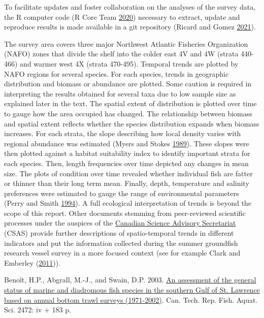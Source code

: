 \documentclass[12pt]{article}\usepackage[]{graphicx}\usepackage[]{color}
\begin{document}
To facilitate updates and foster collaboration on the analyses of the survey data, the R computer code (R Core Team \protect\hyperlink{ref-R:2020}{2020}) necessary to extract, update and reproduce results is made available in a git repository (Ricard and Gomez \protect\hyperlink{ref-Ricard-Gomez-2021}{2021}).

The survey area covers three major Northwest Atlantic Fisheries Organization (NAFO) zones that divide the shelf into the colder east 4V and 4W (strata 440-466) and warmer west 4X (strata 470-495). Temporal trends are plotted by NAFO regions for several species. For each species, trends in geographic distribution and biomass or abundance are plotted. Some caution is required in interpreting the results obtained for several taxa due to low sample size as explained later in the text. The spatial extent of distribution is plotted over time to gauge how the area occupied has changed. The relationship between biomass and spatial extent reflects whether the species distribution expands when biomass increases. For each strata, the slope describing how local density varies with regional abundance was estimated (Myers and Stokes \protect\hyperlink{ref-Myers:Stokes:1989}{1989}). These slopes were then plotted against a habitat suitability index to identify important strata for each species. Then, length frequencies over time depicted any changes in mean size. The plots of condition over time revealed whether individual fish are fatter or thinner than their long term mean. Finally, depth, temperature and salinity preferences were estimated to gauge the range of environmental parameters (Perry and Smith \protect\hyperlink{ref-Perry:Smith:1994:cjfas}{1994}). A full ecological interpretation of trends is beyond the scope of this report. Other documents stemming from peer-reviewed scientific processes under the auspices of the \href{https://www.dfo-mpo.gc.ca/csas-sccs/}{Canadian Science Advisory Secretariat} (CSAS) provide further descriptions of spatio-temporal trends in different indicators and put the information collected during the summer groundfish research vessel survey in a more focused context (see for example Clark and Emberley (\protect\hyperlink{ref-ClarkEmberley2011}{2011})).

\hypertarget{refs}{}
\leavevmode\hypertarget{ref-Benoit:etal:2003:techreport}{}%
Benoît, H.P., Abgrall, M.-J., and Swain, D.P. 2003. \href{http://publications.gc.ca/site/eng/428386/publication.html}{An assessment of the general status of marine and diadromous fish species in the southern Gulf of St. Lawrence based on annual bottom trawl surveys (1971-2002)}. Can. Tech. Rep. Fish. Aquat. Sci. 2472: iv + 183 p.
\end{document}
